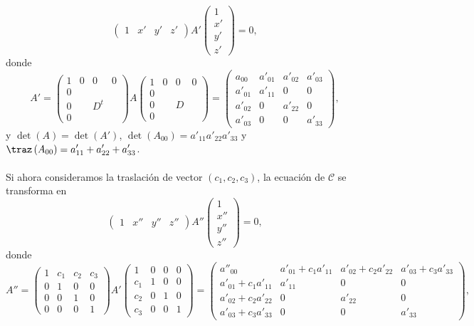 			\[\begin{pmatrix} 1 & x' & y' & z' \end{pmatrix}A'\begin{pmatrix} 1 \\ x' \\ y ' \\ z' \end{pmatrix} = 0 , \]
donde 
\[A' = \begin{pmatrix} 1 & 0 & 0 & 0 \\
		0 & & & \\
	0 & & D^{t}& \\
0 & & & \end{pmatrix}A\begin{pmatrix} 1 & 0 & 0 & 0 \\
		0 & & & \\
	0 & & D & \\
	0 & & & \end{pmatrix} = \begin{pmatrix} a_{00} & a'_{01} & a'_{02} & a'_{03} \\
a'_{01} & a'_{11} & 0 & 0 \\
a'_{02} & 0 & a'_{22} & 0 \\
a'_{03} & 0 & 0 & a'_{33}\end{pmatrix}, \]
y $\displaystyle \det\left(A\right) = \det\left(A'\right) $, $\displaystyle \det\left(A_{00}\right) = a'_{11}a'_{22}a'_{33} $ y $\displaystyle \traz\left(A_{00}\right) = a'_{11}+a'_{22}+a'_{33} $. \\ \\
Si ahora consideramos la traslación de vector $\displaystyle \left(c_{1}, c_{2}, c_{3}\right) $, la ecuación de $\displaystyle \mathcal{C} $ se transforma en 
	\[ \begin{pmatrix} 1 & x'' & y'' & z'' \end{pmatrix}A''\begin{pmatrix} 1 \\ x'' \\ y'' \\ z'' \end{pmatrix} = 0, \]
donde
	\[A'' = \begin{pmatrix} 1 & c_{1} & c_{2} & c_{3} \\
	0 & 1 & 0 & 0 \\
0 & 0 & 1 & 0 \\
0 & 0 & 0 & 1\end{pmatrix} A' 
		\begin{pmatrix} 1 & 0 & 0 & 0 \\
		c_{1} & 1 & 0 & 0 \\
	c_{2}& 0 & 1 & 0 \\
c_{3} & 0 & 0 & 1\end{pmatrix} = 
			\begin{pmatrix} a''_{00} & a'_{01}+c_{1}a'_{11} & a'_{02}+c_{2}a'_{22} & a'_{03}+c_{3}a'_{33} \\
			a'_{01}+c_{1}a'_{11} & a'_{11} & 0 & 0 \\
		a'_{02}+c_{2}a'_{22} & 0 & a'_{22} & 0 \\
	a'_{03}+c_{3}a'_{33} & 0 & 0 & a'_{33}\end{pmatrix}, \]
